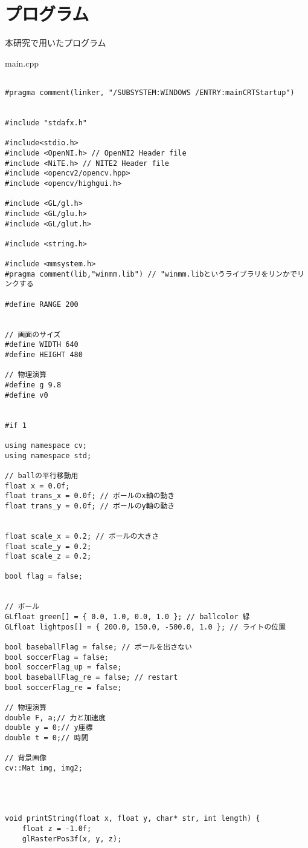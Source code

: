 \chapter{プログラム}
\thispagestyle{fancy}

本研究で用いたプログラム

\vspace{0.5cm}

main.cpp
\begin{lstlisting}

#pragma comment(linker, "/SUBSYSTEM:WINDOWS /ENTRY:mainCRTStartup")


#include "stdafx.h"

#include<stdio.h>
#include <OpenNI.h> // OpenNI2 Header file
#include <NiTE.h> // NITE2 Header file
#include <opencv2/opencv.hpp>
#include <opencv/highgui.h>

#include <GL/gl.h>
#include <GL/glu.h>
#include <GL/glut.h>

#include <string.h>

#include <mmsystem.h>
#pragma comment(lib,"winmm.lib") // "winmm.libというライブラリをリンかでリンクする

#define RANGE 200


// 画面のサイズ
#define WIDTH 640 
#define HEIGHT 480

// 物理演算
#define g 9.8
#define v0 


#if 1

using namespace cv;
using namespace std;

// ballの平行移動用
float x = 0.0f;
float trans_x = 0.0f; // ボールのx軸の動き
float trans_y = 0.0f; // ボールのy軸の動き


float scale_x = 0.2; // ボールの大きさ
float scale_y = 0.2;
float scale_z = 0.2;

bool flag = false;


// ボール
GLfloat green[] = { 0.0, 1.0, 0.0, 1.0 }; // ballcolor 緑
GLfloat lightpos[] = { 200.0, 150.0, -500.0, 1.0 }; // ライトの位置

bool baseballFlag = false; // ボールを出さない
bool soccerFlag = false;
bool soccerFlag_up = false;
bool baseballFlag_re = false; // restart
bool soccerFlag_re = false;

// 物理演算
double F, a;// 力と加速度
double y = 0;// y座標
double t = 0;// 時間

// 背景画像
cv::Mat img, img2;




void printString(float x, float y, char* str, int length) {
	float z = -1.0f;
	glRasterPos3f(x, y, z);


\end{lstlisting}
